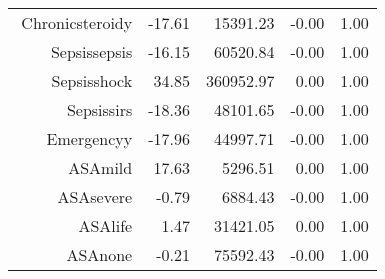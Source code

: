 \begin{tabular}{rrrrr}
$$  Chronic\-steroid\-y & -17.61 & 15391.23 & -0.00 & 1.00 \\ 
  Sepsis\-sepsis & -16.15 & 60520.84 & -0.00 & 1.00 \\ 
  Sepsis\-shock & 34.85 & 360952.97 & 0.00 & 1.00 \\ 
  Sepsis\-sirs & -18.36 & 48101.65 & -0.00 & 1.00 \\ 
  Emergency\-y & -17.96 & 44997.71 & -0.00 & 1.00 \\ 
  ASA\-mild & 17.63 & 5296.51 & 0.00 & 1.00 \\ 
  ASA\-severe & -0.79 & 6884.43 & -0.00 & 1.00 \\ 
  ASA\-life & 1.47 & 31421.05 & 0.00 & 1.00 \\ 
  ASA\-none & -0.21 & 75592.43 & -0.00 & 1.00 \\ 
   \hline
\end{tabular}

